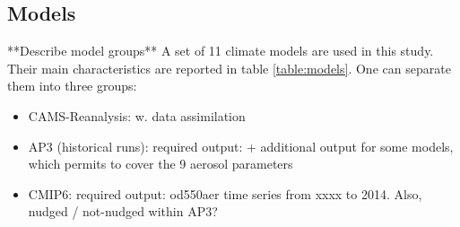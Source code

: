 \documentclass[journal abbreviation, manuscript]{copernicus}
\begin{document}
\subsection{Models}

**Describe model groups**
A set of 11 climate models are used in this study. Their main characteristics are reported in table \ref{table:models}.  One can separate them into three groups:
\begin{itemize}
 \item CAMS-Reanalysis: w. data assimilation
 \item AP3 (historical runs): required output: + additional output for some models, which permits to cover the 9 aerosol parameters
 \item CMIP6: required output: od550aer time series from xxxx to 2014.
       Also, nudged / not-nudged within AP3?
\end{itemize}
\end{document}
